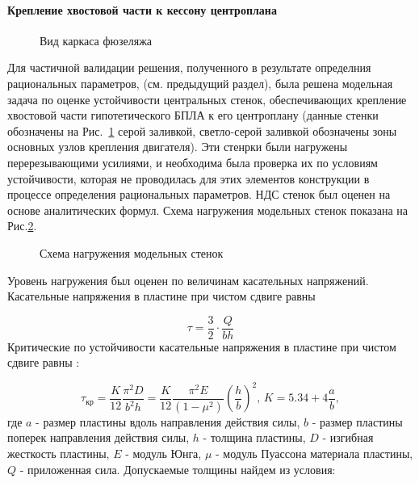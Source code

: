  \paragraph{Крепление хвостовой части к кессону центроплана} 
\label{sec:pants}
\begin{figure}[H]
\centering
\def\svgwidth{\textwidth}

\caption{Вид каркаса фюзеляжа}
\label{fig:IsoviewOfPants}
\end{figure}


Для частичной валидации решения, полученного в результате определния рациональных параметров, (см. предыдущий раздел), была решена модельная задача по оценке устойчивости центральных стенок, обеспечивающих крепление хвостовой части гипотетического БПЛА к его центроплану (данные стенки обозначены на Рис.~\ref{fig:IsoviewOfPants} серой заливкой, светло-серой заливкой обозначены зоны основных узлов крепления двигателя). Эти стенрки были нагружены перерезывающими усилиями, и необходима была проверка их по условиям устойчивости, которая не проводилась для этих элементов конструкции в процессе определения рациональных параметров. НДС стенок был оценен на основе аналитических формул. Схема нагружения модельных стенок показана на Рис.\ref{fig:IsoviewOfPantsModel}.

\begin{figure}[H]
\centering

\caption{Схема нагружения модельных стенок}
\label{fig:IsoviewOfPantsModel}
\end{figure}

%


Уровень нагружения был оценен по величинам касательных напряжений. Касательные напряжения в пластине при чистом сдвиге равны

\begin{equation}
\tau=\frac{3}{2}\cdot\frac{Q}{bh}
\end{equation}
Критические по устойчивости касательные напряжения в пластине при чистом сдвиге равны \cite{Volmir}:

\begin{equation}
\tau_\text{кр}=\frac{K}{12}\frac{\pi^2D}{b^2h} = \frac{K}{12}\frac{\pi^2E}{(1-\mu^2)}\left(\frac{h}{b}\right)^2,\, K=5.34 + 4\frac{a}{b},
\end{equation}
где $a$ - размер пластины вдоль направления действия силы, $b$ - размер пластины поперек направления действия силы, $h$ - толщина пластины, $D$ - изгибная жесткость пластины, $E$ - модуль Юнга, $\mu$ - модуль Пуассона материала пластины, $Q$ - приложенная сила.
Допускаемые толщины найдем из условия:

